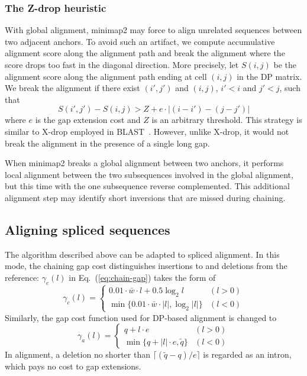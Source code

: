 \documentclass{bioinfo}
\begin{document}
\begin{methods}
\subsubsection{The Z-drop heuristic}

With global alignment, minimap2 may force to align unrelated sequences between
two adjacent anchors. To avoid such an artifact, we compute accumulative
alignment score along the alignment path and break the alignment where the
score drops too fast in the diagonal direction. More precisely, let $S(i,j)$ be
the alignment score along the alignment path ending at cell $(i,j)$ in the DP
matrix. We break the alignment if there exist $(i',j')$ and $(i,j)$, $i'<i$ and
$j'<j$, such that
\[
S(i',j')-S(i,j)>Z+e\cdot|(i-i')-(j-j')|
\]
where $e$ is the gap extension cost and $Z$ is an arbitrary threshold.
This strategy is similar to X-drop employed in BLAST~\citep{Altschul:1997vn}.
However, unlike X-drop, it would not break the alignment in the presence of a
single long gap.

When minimap2 breaks a global alignment between two anchors, it performs local
alignment between the two subsequences involved in the global alignment, but
this time with the one subsequence reverse complemented. This additional
alignment step may identify short inversions that are missed during chaining.

\subsection{Aligning spliced sequences}

The algorithm described above can be adapted to spliced alignment. In this
mode, the chaining gap cost distinguishes insertions to and deletions from the
reference: $\gamma_c(l)$ in Eq.~(\ref{eq:chain-gap}) takes the form of
\[
\gamma_c(l)=\left\{\begin{array}{ll}
0.01\cdot\bar{w}\cdot l+0.5\log_2 l & (l>0) \\
\min\{0.01\cdot\bar{w}\cdot|l|,\log_2|l|\} & (l<0)
\end{array}\right.
\]
Similarly, the gap cost function used for DP-based alignment is changed to
\[
\gamma_a(l)=\left\{\begin{array}{ll}
q+l\cdot e & (l>0) \\
\min\{q+|l|\cdot e,\tilde{q}\} & (l<0)
\end{array}\right.
\]
In alignment, a deletion no shorter than $\lceil(\tilde{q}-q)/e\rceil$ is
regarded as an intron, which pays no cost to gap extensions.


\end{methods}
\end{document}
